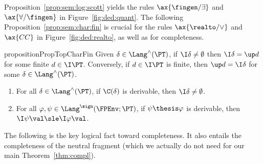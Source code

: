 
Proposition~\ref{prop:sem:log:scott} yields 
the rules $\ax{\fingen/\exists}$ and $\ax{\forall/\fingen}$
in Figure~\ref{fig:ded:quant}.
The following Proposition~\ref{prop:sem:char:fin}
is crucial for the rules
$\ax{{\realto}/\lor}$ and $\ax{CC}$ in Figure~\ref{fig:ded:realto},
as well as for completeness.


\begin{restatable}{proposition}{PropTopCharFin}
\label{prop:sem:char:fin}
Given $\delta \in \Lang^\land(\PT)$,
if $\I\delta \neq \emptyset$ then
$\I\delta = \up d$ for some finite $d \in \I\PT$.
Conversely, if $d \in \I\PT$ is finite, then $\up d = \I\delta$ for some
$\delta \in \Lang^{\land}(\PT)$.
\end{restatable}

\begin{theorem}[restate = ThmLogSound, name = Soundness of Deduction]
\label{thm:sem:log:sound}
\hfill
\begin{enumerate}[(1)]
\item
\label{item:sem:log:sound:cons}
For all $\delta \in \Lang^\land(\PT)$,
if $\C(\delta)$ is derivable, then $\I\delta \neq \emptyset$.

\item
\label{item:sem:log:sound:ded}
For all $\varphi, \psi \in \Lang^\sign(\FPEnv;\PT)$,
if $\psi \thesis \varphi$ is derivable,
then $\I\psi\val \sle \I\varphi\val$.
\end{enumerate}
\end{theorem}

The following is the key logical fact toward completeness.
It also entails the completeness of the neutral fragment
(which we actually do not need for our main Theorem~\ref{thm:compl}).

